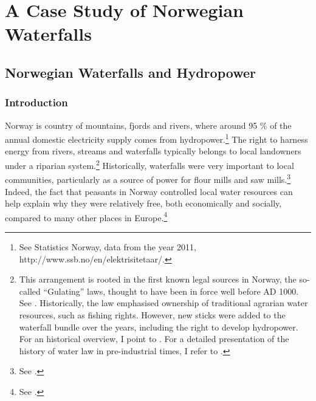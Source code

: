 \part{A Case Study of Norwegian Waterfalls}

\chapter{Norwegian Waterfalls and Hydropower}\label{chap:3}

\section{Introduction}\label{sec:into3}

Norway is country of mountains, fjords and rivers, where around 95 \% of the annual domestic electricity supply comes from hydropower.\footnote{See Statistics Norway, data from the year 2011, http://www.ssb.no/en/elektrisitetaar/.} The right to harness energy from rivers, streams and waterfalls typically belongs to local landowners under a riparian system.\footnote{This arrangement is rooted in the first known legal sources in Norway, the so-called ``Gulating'' laws, thought to have been in force well before AD 1000. See \cite[111-112,120]{robberstad81}. Historically, the law emphasised ownership of traditional agrarian water resources, such as fishing rights. However, new sticks were added to the waterfall bundle over the years, including the right to develop hydropower. For an historical overview, I point to \cite[14-32]{vislie44}. For a detailed presentation of the history of water law in pre-industrial times, I refer to \cite{motzfeld08}. } Historically, waterfalls were very important to local communities, particularly as a source of power for flour mills and saw mills.\footnote{See \cite[121]{tvedt13}.} Indeed, the fact that peasants in Norway controlled local water resources can help explain why they were relatively free, both economically and socially, compared to many other places in Europe.\footnote{See \cite[121]{tvedt13}.}

